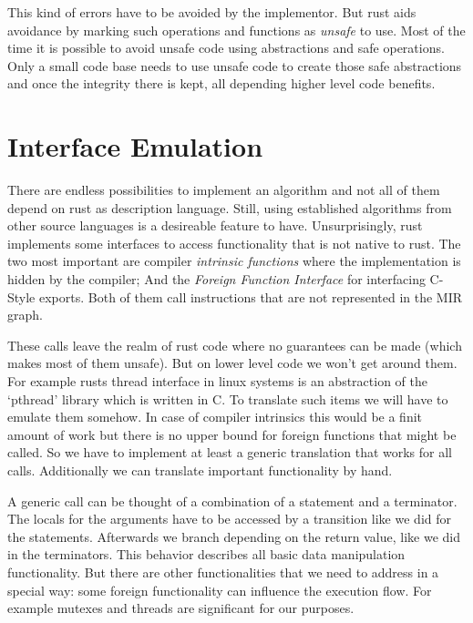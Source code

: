 This kind of errors have to be avoided by the implementor.
But rust aids avoidance by marking such operations and functions as \textit{unsafe} to use.
Most of the time it is possible to avoid unsafe code using abstractions and safe operations.
Only a small code base needs to use unsafe code to create those safe abstractions and once the integrity there is kept, all depending higher level code benefits.


\section{Interface Emulation}
There are endless possibilities to implement an algorithm and not all of them depend on rust as description language.
Still, using established algorithms from other source languages is a desireable feature to have.
Unsurprisingly, rust implements some interfaces to access functionality that is not native to rust.
The two most important are compiler \textit{intrinsic functions} where the implementation is hidden by the compiler;
And the \textit{Foreign Function Interface} for interfacing C-Style exports.
Both of them call instructions that are not represented in the MIR graph.

These calls leave the realm of rust code where no guarantees can be made (which makes most of them unsafe).
But on lower level code we won't get around them.
For example rusts thread interface in linux systems is an abstraction of the `pthread' library which is written in C.
To translate such items we will have to emulate them somehow.
In case of compiler intrinsics this would be a finit amount of work but there is no upper bound for foreign functions that might be called.
So we have to implement at least a generic translation that works for all calls.
Additionally we can translate important functionality by hand.

A generic call can be thought of a combination of a statement and a terminator.
The locals for the arguments have to be accessed by a transition like we did for the statements.
Afterwards we branch depending on the return value, like we did in the terminators.
This behavior describes all basic data manipulation functionality.
But there are other functionalities that we need to address in a special way:
some foreign functionality can influence the execution flow.
For example mutexes and threads are significant for our purposes.

